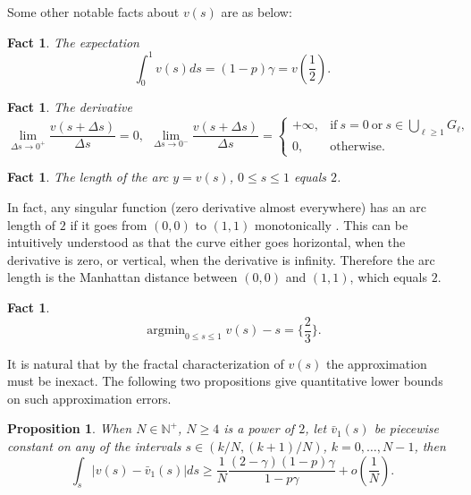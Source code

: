 \documentclass{article}
\newtheorem{proposition}[theorem]{Proposition}
\newtheorem{fact}[theorem]{Fact}
\theoremstyle{named}
\DeclareMathOperator*{\argmin}{arg min}
\begin{document}
Some other notable facts about $v(s)$ are as below:

\begin{fact}
The expectation \[ \int_0^1 v(s)ds=(1-p)\gamma=v(\frac{1}{2}). \]
\end{fact}

\begin{fact}
\label{thm:derivative}
The derivative
\begin{equation}
\lim_{\Delta s \rightarrow 0^+}\frac{v(s+\Delta s)}{\Delta s} = 0, \ \ \lim_{\Delta s \rightarrow 0^-}\frac{v(s+\Delta s)}{\Delta s} =
\begin{cases}
+\infty, & \text{if}\ s=0 \ \text{or} \ s\in\bigcup_{\ell\geq 1} G_\ell, \\
0, & \text{otherwise}.
\end{cases}
\end{equation}
\end{fact}

\begin{fact}
The length of the arc $y=v(s)$, $0\leq s \leq 1$ equals $2$.
\end{fact}

In fact, any singular function (zero derivative almost everywhere) has an arc length of $2$ if it goes from $(0,0)$ to $(1,1)$ monotonically \cite{pelling1977formulae}. This can be intuitively understood as that the curve either goes horizontal, when the derivative is zero, or vertical, when the derivative is infinity. Therefore the arc length is the Manhattan distance between $(0,0)$ and $(1,1)$, which equals $2$.

\begin{fact}
\[ \argmin_{0\leq s \leq 1} v(s)-s=\{\frac{2}{3}\}. \]
\end{fact}

It is natural that by the fractal characterization of $v(s)$ the approximation must be inexact. The following two propositions give quantitative lower bounds on such approximation errors.

\begin{proposition}
\label{thm:approxdisc}
When $N\in \mathbb{N}^+$, $N\ge 4$ is a power of $2$, let $\bar v_1(s)$ be piecewise constant on any of the intervals $s\in (k/N, (k+1)/N)$, $k=0,\dots,N-1$, then
\[
\int_s \left| v(s)-\bar v_1(s) \right| ds \geq \frac{1}{N}\frac{(2-\gamma)(1-p)\gamma}{1-p\gamma} + o(\frac{1}{N}).
\]
\end{proposition}
\end{document}
